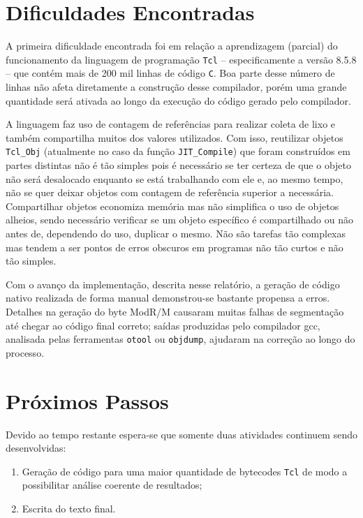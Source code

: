 \section{Dificuldades Encontradas}

A primeira dificuldade encontrada foi em relação a aprendizagem
(parcial) do funcionamento da linguagem de programação \texttt{Tcl} --
especificamente a versão 8.5.8 --
que contém mais de 200 mil linhas de código \texttt{C}. Boa parte
desse número de linhas não afeta diretamente a construção desse
compilador, porém uma grande quantidade será ativada
ao longo da execução do código gerado pelo compilador.

A linguagem faz uso de contagem de referências para realizar coleta de
lixo e também compartilha muitos dos valores utilizados. Com isso,
reutilizar objetos \verb!Tcl_Obj! (atualmente no caso da função
\verb!JIT_Compile!) que foram construídos em partes distintas não é tão
simples pois é necessário se ter certeza de que o objeto não será
desalocado enquanto se está trabalhando com ele e, ao mesmo tempo, não
se quer deixar objetos com contagem de referência superior a
necessária. Compartilhar objetos economiza memória mas não simplifica
o uso de objetos alheios, sendo necessário verificar se um objeto
específico é compartilhado ou não antes de, dependendo do uso,
duplicar o mesmo. Não são tarefas tão complexas mas tendem a ser
pontos de erros obscuros em programas não tão curtos e não tão simples.

Com o avanço da implementação, descrita nesse relatório, a geração de
código nativo realizada de forma manual demonstrou-se bastante
propensa a erros. Detalhes na geração do byte ModR/M causaram muitas
falhas de segmentação até chegar ao código final correto; saídas
produzidas pelo compilador gcc, analisada pelas ferramentas \verb!otool! ou
\verb!objdump!, ajudaram na correção ao longo do processo.

\section{Próximos Passos}

Devido ao tempo restante espera-se que somente duas atividades
continuem sendo desenvolvidas:
\begin{enumerate}
\item Geração de código para uma maior quantidade de bytecodes
  \texttt{Tcl} de modo a possibilitar análise coerente de resultados;
\item Escrita do texto final.
\end{enumerate}

